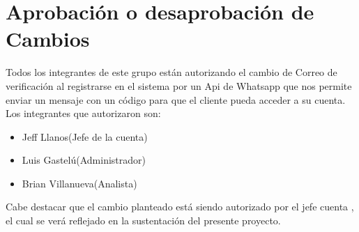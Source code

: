 
\chapter{Aprobaci\'on o desaprobaci\'on de Cambios}
\label{intro}


Todos los integrantes de este grupo están autorizando el cambio de Correo de verificación al registrarse en el sistema por un Api de Whatsapp que nos permite enviar un mensaje con un código para que el cliente pueda acceder a su cuenta.
Los integrantes que autorizaron son:
\begin{itemize}
\item	Jeff Llanos(Jefe de la cuenta)
\item	Luis Gastelú(Administrador)
\item	Brian Villanueva(Analista)
\end{itemize}

Cabe destacar que el cambio planteado está siendo autorizado por el jefe cuenta , el cual se verá reflejado en la sustentación del presente proyecto.



\cleardoublepage